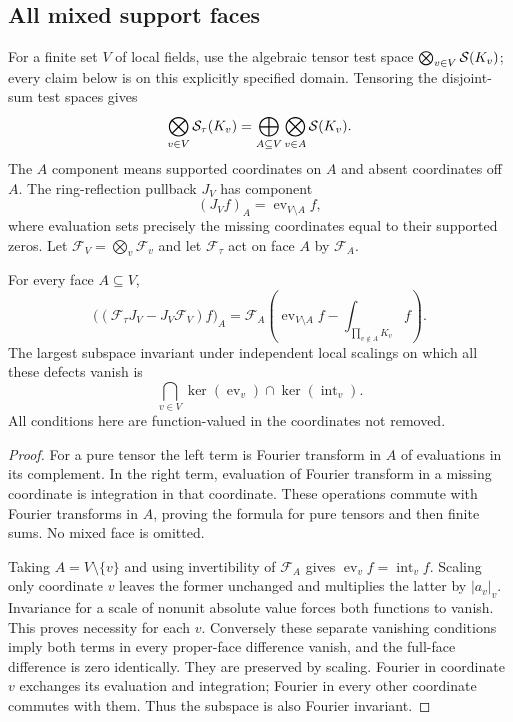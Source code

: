 \subsection{All mixed support faces}
For a finite set $V$ of local fields, use the algebraic tensor test space $\bigotimes_{v\in V}\mathcal S(K_v)$; every claim below is on this explicitly specified domain. Tensoring the disjoint-sum test spaces gives
\[
 \bigotimes_{v\in V}\mathcal S_\tau(K_v)
 =\bigoplus_{A\subseteq V}\bigotimes_{v\in A}\mathcal S(K_v).
\]
The $A$ component means supported coordinates on $A$ and absent coordinates off $A$. The ring-reflection pullback $J_V$ has component
\[
 (J_Vf)_A=\operatorname{ev}_{V\setminus A}f,
\]
where evaluation sets precisely the missing coordinates equal to their supported zeros. Let $\mathcal F_V=\bigotimes_v\mathcal F_v$ and let $\mathcal F_\tau$ act on face $A$ by $\mathcal F_A$.

\begin{theorem}\label{thm:mixed-fourier-defect}
For every face $A\subseteq V$,
\begin{equation}\label{eq:mixed-defect}
 \bigl((\mathcal F_\tau J_V-J_V\mathcal F_V)f\bigr)_A
 =\mathcal F_A\left(\operatorname{ev}_{V\setminus A}f
                   -\int_{\prod_{v\notin A}K_v}f\right).
\end{equation}
The largest subspace invariant under independent local scalings on which all these defects vanish is
\begin{equation}\label{eq:full-mixed-Schwartz}
 \bigcap_{v\in V}\ker(\operatorname{ev}_v)\cap\ker(\operatorname{int}_v).
\end{equation}
All conditions here are function-valued in the coordinates not removed.
\end{theorem}
\begin{proof}
For a pure tensor the left term is Fourier transform in $A$ of evaluations in its complement. In the right term, evaluation of Fourier transform in a missing coordinate is integration in that coordinate. These operations commute with Fourier transforms in $A$, proving the formula for pure tensors and then finite sums. No mixed face is omitted.

Taking $A=V\setminus\{v\}$ and using invertibility of $\mathcal F_A$ gives $\operatorname{ev}_vf=\operatorname{int}_vf$. Scaling only coordinate $v$ leaves the former unchanged and multiplies the latter by $|a_v|_v$. Invariance for a scale of nonunit absolute value forces both functions to vanish. This proves necessity for each $v$. Conversely these separate vanishing conditions imply both terms in every proper-face difference vanish, and the full-face difference is zero identically. They are preserved by scaling. Fourier in coordinate $v$ exchanges its evaluation and integration; Fourier in every other coordinate commutes with them. Thus the subspace is also Fourier invariant.
\end{proof}

